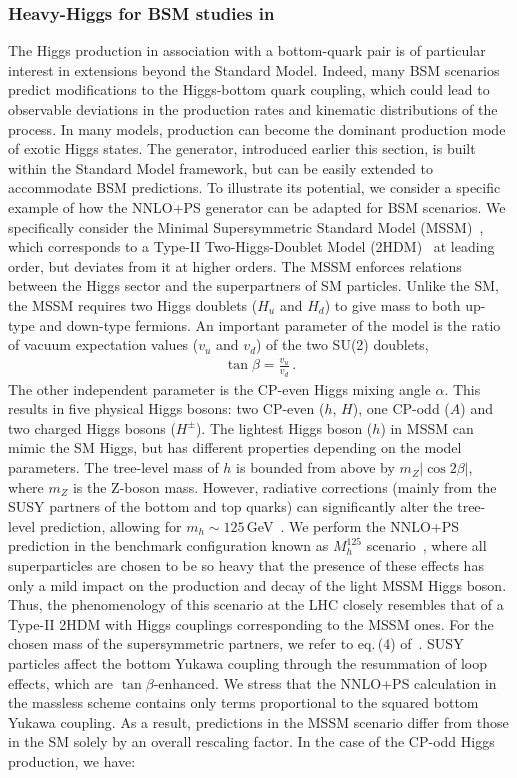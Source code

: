 \documentclass[11pt,a4paper]{article}
\begin{document}
\subsubsection{Heavy-Higgs for BSM studies in \minnlo{}}

The Higgs production in association with a bottom-quark pair is of particular interest in extensions beyond the Standard Model. Indeed, many BSM scenarios predict modifications to the Higgs-bottom quark coupling, which could lead to observable deviations in the production rates and kinematic distributions of the \bbH{} process. In many models, \bbH{} production can become the dominant production mode of exotic Higgs states. The \minnlo{} generator, introduced earlier this section, is built within the Standard Model framework, but can be easily extended to accommodate BSM predictions. To illustrate its potential, we consider a specific example of how the NNLO+PS generator can be adapted for BSM scenarios. We specifically consider the Minimal Supersymmetric Standard Model (MSSM)~\cite{Ovrut:1984uc,Haber:1984rc,Gunion:1984yn}, which corresponds to a Type-II Two-Higgs-Doublet Model (2HDM)~\cite{Branco:2011iw} at leading order, but deviates from it at higher orders. The MSSM enforces relations between the Higgs sector and the superpartners of SM particles. Unlike the SM, the MSSM requires two Higgs doublets ($H_u$ and $H_d$) to give mass to both up-type and down-type fermions. An important parameter of the model is the ratio of vacuum expectation values ($v_u$ and $v_d$) of the two SU(2) doublets,
\begin{align}
	\tan\beta=\frac{v_u}{v_d}\,.
\end{align}
The other independent parameter is the CP-even Higgs mixing angle $\alpha$. This results in five physical Higgs bosons: two CP-even ($h$, $H$), one CP-odd ($A$) and two charged Higgs bosons ($H^{\pm}$). The lightest Higgs boson ($h$) in MSSM can mimic the SM Higgs, but has different properties depending on the model parameters. The tree-level mass of $h$ is bounded from above by $m_Z |\cos 2\beta|$, where $m_Z$ is the Z-boson mass. However, radiative corrections (mainly from the SUSY partners of the bottom and top quarks) can significantly alter the tree-level prediction, allowing for $m_h\sim 125$\,GeV~\cite{Heinemeyer:2011aa,Bechtle:2012jw,Draper:2016pys,Bechtle:2016kui,Haber:2017erd}. We perform the NNLO+PS prediction in the benchmark configuration known as $M_h^{125}$ scenario~\cite{Bagnaschi:2018ofa}, where all superparticles are chosen to be so heavy that the presence of these effects has only a mild impact on the production and decay of the light MSSM Higgs boson. Thus, the phenomenology of this scenario at the LHC closely resembles that of a Type-II 2HDM with Higgs couplings corresponding to the MSSM ones. For the chosen mass of the supersymmetric partners, we refer to eq.\,(4) of~. SUSY particles affect the bottom Yukawa coupling through the resummation of loop effects, which are $\tan\beta$-enhanced. We stress that the NNLO+PS calculation in the massless scheme contains only terms proportional to the squared bottom Yukawa coupling. As a result, \bbH{} predictions in the MSSM scenario differ from those in the SM solely by an overall rescaling factor. In the case of the CP-odd Higgs production, we have:
\end{document}
